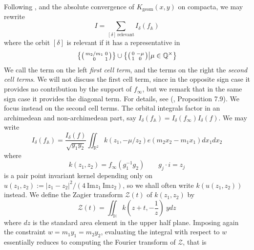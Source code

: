 \documentclass{article}
\numberwithin{equation}{section}
\begin{document}
Following \cite{KL-petersson}, and the absolute convergence of $K_\text{geom}(x,y)$ on compacta, we may rewrite
\begin{equation}
    I = \sum_{[\delta]\ \text{relevant}} I_\delta(f_\mathbb{A})
\end{equation}
where the orbit $[\delta]$ is relevant if it has a representative in 
\begin{equation}\label{def:cells}
    \left\{ \begin{psmallmatrix}
        m_2/m_1 & 0 \\ 0 & 1
    \end{psmallmatrix}  \right\}\cup \left\{ \begin{psmallmatrix}
        0 & -\mu \\ 1 & 0
    \end{psmallmatrix} \bigr| \mu \in\mathbb{Q}^\times\right\}
\end{equation}
We call the term on the left  \emph{first cell term}, and the terms on the right the \emph{second cell terms}. We will not discuss the first cell term, since in the opposite sign case it provides no contribution by the support of $f_\infty$, but we remark that in the same sign case it provides the diagonal term. For details, see (\cite{KL-kuznetsov}, Proposition 7.9). We focus instead on the second cell terms. The orbital integrals factor in an archimedean and non-archimedean part, say $I_\delta(f_\mathbb{A})=I_\delta(f_\infty)I_\delta(f)$. We may write
\begin{equation}\label{eq:unrefined_geometric}
    I_\delta(f_\mathbb{A})=\frac{I_\delta(f)}{\sqrt{y_1y_2}}\iint_{\mathbb{R}^2}k(z_1,-\mu/z_2)e(m_2x_2-m_1x_1)dx_1dx_2
\end{equation}
where 
\begin{equation}\label{def:pair-point-kernel}
    k(z_1,z_2)=f_\infty(g_1^{-1}g_2) \qquad g_j\cdot i = z_j
\end{equation}
is a pair point invariant kernel depending only on $u(z_1,z_2):=|z_1-z_2|^2/(4 \ \text{Im}z_1\  \text{Im}z_2)$, so we shall often write $k(u(z_1,z_2))$ instead. We define the Zagier transform $\mathcal{Z}(t)$ of $k(z_1,z_2)$ by
\begin{equation}
    \mathcal{Z}(t)=\iint_{\mathbb{H}}k(z+t,-\frac{1}{z})\ y dz
\end{equation}
where $dz$ is the standard area element in the upper half plane. Imposing again the constraint $w=m_1y_1=m_2y_2$, evaluating the integral with respect to $w$ essentially reduces to computing the Fourier transform of $\mathcal{Z}$, that is
\end{document}
